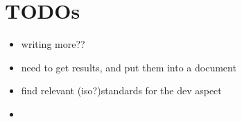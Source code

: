 \documentclass[11pt]{article}
\begin{document}
\section{TODOs}
    \begin{itemize}
        \item writing more??
        \item need to get results, and put them into a document
        \item find relevant (iso?)standards for the dev aspect
        \item
    \end{itemize}
\end{document}

